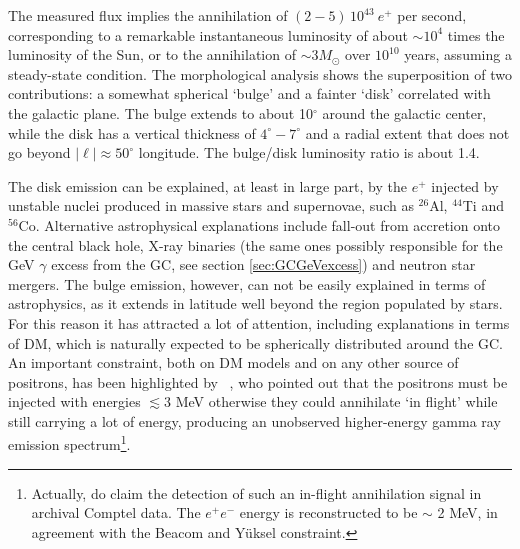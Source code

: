 The measured flux implies the annihilation of $(2-5) \, 10^{43}\ e^+$ per second, corresponding to a remarkable instantaneous luminosity of about $\sim10^4$ times the luminosity of the Sun, or to the annihilation of $\sim 3 M_{\odot}$ over $10^{10}$ years, assuming a steady-state condition. 
The morphological analysis shows the superposition of two contributions: a somewhat spherical `bulge' and a fainter `disk' correlated with the galactic plane. The bulge extends to about 10$^\circ$ around the galactic center, while the disk has a vertical thickness of $4^\circ-7^\circ$ and a radial extent that does not go beyond  $|\ell| \approx 50^\circ$ longitude. The bulge/disk luminosity ratio is about 1.4.

\smallskip

The disk emission can be explained, at least in large part, by the $e^+$ injected by unstable nuclei produced in massive stars and supernovae, such as $^{26}$Al, $^{44}$Ti and $^{56}$Co. Alternative astrophysical explanations include fall-out from accretion onto the central black hole, X-ray binaries (the same ones possibly responsible for the GeV $\gamma$ excess from the GC, see section \ref{sec:GCGeVexcess}) and neutron star mergers. The bulge emission, however, can not be easily explained in terms of astrophysics, as it extends in latitude well beyond the region populated by stars. For this reason it has attracted a lot of attention, including explanations in terms of DM, which is naturally expected to be spherically distributed around the GC. An important constraint, both on DM models and on any other source of positrons, has been highlighted by ~\cite{511KeVline}, who pointed out that the positrons must be injected with energies $\lesssim 3$ MeV otherwise they could annihilate `in flight' while still carrying  a lot of energy, producing an unobserved higher-energy gamma ray emission spectrum\footnote{Actually,  \cite{511KeVline} do claim the detection of such an in-flight annihilation signal in archival {\sc Comptel} data.  The $e^+e^-$ energy is reconstructed to be $\sim$ 2 MeV, in agreement with the Beacom and Y\"uksel constraint.}. 

\bigskip

